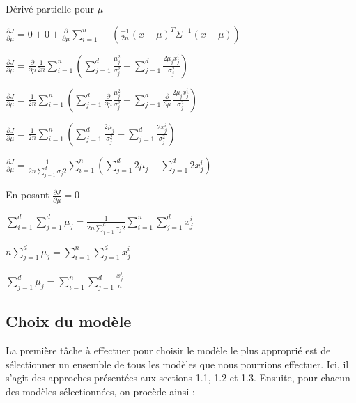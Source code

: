 \documentclass[a4paper,10pt]{article}
\begin{document}
Dérivé partielle pour $\mu$

$\frac{\partial J}{\partial \mu} = 0 + 0 + \frac{\partial }{\partial \mu} \sum_{i=1}^{n}  - (\frac{-1}{2n} (x- \mu)^{T} \Sigma^{-1} (x- \mu) )$ 

$\frac{\partial J}{\partial \mu} = \frac{\partial }{\partial \mu} \frac{1}{2n} \sum_{i=1}^{n} (\sum_{j=1}^{d}\frac{\mu_{j}^{2}}{\sigma_{j}^{2}} - \sum_{j=1}^{d} \frac{2\mu_{j}x_{j}^{i}}{\sigma_{j}^{2}})$ 

$\frac{\partial J}{\partial \mu} =  \frac{1}{2n} \sum_{i=1}^{n} (\sum_{j=1}^{d} \frac{\partial }{\partial \mu} \frac{\mu_{j}^{2}}{\sigma_{j}^{2}} - \sum_{j=1}^{d} \frac{\partial }{\partial \mu} \frac{2\mu_{j}x_{j}^{i}}{\sigma_{j}^{2}})$ 

$\frac{\partial J}{\partial \mu} =  \frac{1}{2n} \sum_{i=1}^{n} (\sum_{j=1}^{d}\frac{2 \mu_{j}}{\sigma_{j}^{2}} - \sum_{j=1}^{d} \frac{2x_{j}^{i}}{\sigma_{j}^{2}})$ 


$\frac{\partial J}{\partial \mu} =  \frac{1}{2n \sum_{j=1}^{d} \sigma_{j}{2}} \sum_{i=1}^{n} (\sum_{j=1}^{d}2 \mu_{j} - \sum_{j=1}^{d} 2x_{j}^{i})$ 


En posant $\frac{\partial J}{\partial \mu} = 0$

$\sum_{i=1}^{d}\sum_{j=1}^{d} \mu_{j} = \frac{1}{2n \sum_{j=1}^{d} \sigma_{j}{2}} \sum_{i=1}^{n}\sum_{j=1}^{d} x_{j}^{i}$

$ n \sum_{j=1}^{d} \mu_{j} = \sum_{i=1}^{n}\sum_{j=1}^{d} x_{j}^{i}$

$\sum_{j=1}^{d} \mu_{j} = \sum_{i=1}^{n}\sum_{j=1}^{d} \frac{x_{j}^{i}}{n}$


\subsection{Choix du modèle}

La première tâche à effectuer pour choisir le modèle le plus approprié est de sélectionner un ensemble de tous les modèles que nous pourrions effectuer. Ici, il s'agit des approches présentées aux sections 1.1, 1.2 et 1.3. Ensuite, pour chacun des modèles sélectionnées, on procède ainsi :
\end{document}
